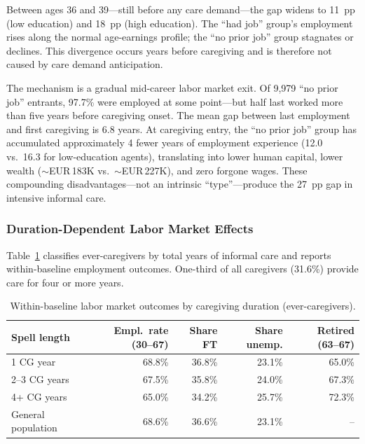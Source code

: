 Between ages 36 and 39---still before any care demand---the gap widens to 11~pp (low education) and 18~pp (high education). The ``had job'' group's employment rises along the normal age-earnings profile; the ``no prior job'' group stagnates or declines. This divergence occurs years before caregiving and is therefore not caused by care demand anticipation.

The mechanism is a gradual mid-career labor market exit. Of 9,979 ``no prior job'' entrants, 97.7\% were employed at some point---but half last worked more than five years before caregiving onset. The mean gap between last employment and first caregiving is 6.8 years. At caregiving entry, the ``no prior job'' group has accumulated approximately 4 fewer years of employment experience (12.0 vs.\ 16.3 for low-education agents), translating into lower human capital, lower wealth ($\sim$EUR\,183K vs.\ $\sim$EUR\,227K), and zero forgone wages. These compounding disadvantages---not an intrinsic ``type''---produce the 27~pp gap in intensive informal care.

\subsubsection{Duration-Dependent Labor Market Effects}

Table~\ref{tab:duration_baseline} classifies ever-caregivers by total years of informal care and reports within-baseline employment outcomes. One-third of all caregivers (31.6\%) provide care for four or more years.

\begin{table}[htbp]
  \centering
  \caption{Within-baseline labor market outcomes by caregiving duration (ever-caregivers).}
  \label{tab:duration_baseline}
  \small
  \begin{tabular}{lrrrr}
    \toprule
    Spell length & Empl.\ rate (30--67) & Share FT & Share unemp. & Retired (63--67) \\
    \midrule
    1 CG year & 68.8\% & 36.8\% & 23.1\% & 65.0\% \\
    2--3 CG years & 67.5\% & 35.8\% & 24.0\% & 67.3\% \\
    4+ CG years & 65.0\% & 34.2\% & 25.7\% & 72.3\% \\
    \addlinespace
    General population & 68.6\% & 36.6\% & 23.1\% & -- \\
    \bottomrule
  \end{tabular}
\end{table}

